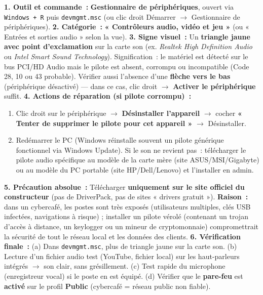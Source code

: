 \documentclass[11pt]{article}
\begin{document}
\begin{corrige}
\textbf{1. Outil et commande~:} \textbf{Gestionnaire de périphériques}, ouvert via \texttt{Windows + R} puis \texttt{devmgmt.msc} (ou clic droit Démarrer $\rightarrow$ Gestionnaire de périphériques).
\textbf{2. Catégorie~:} \textbf{« Contrôleurs audio, vidéo et jeu »} (ou « Entrées et sorties audio » selon la vue).
\textbf{3. Signe visuel~:} Un \textbf{triangle jaune avec point d'exclamation} sur la carte son (ex. \emph{Realtek High Definition Audio} ou \emph{Intel Smart Sound Technology}). Signification~: le matériel est détecté sur le bus PCI/HD Audio mais le pilote est absent, corrompu ou incompatible (Code 28, 10 ou 43 probable). Vérifier aussi l'absence d'une \textbf{flèche vers le bas} (périphérique désactivé) — dans ce cas, clic droit $\rightarrow$ \textbf{Activer le périphérique} suffit.
\textbf{4. Actions de réparation (si pilote corrompu)~:}
\begin{enumerate}
  \item Clic droit sur le périphérique $\rightarrow$ \textbf{Désinstaller l'appareil} $\rightarrow$ cocher \textbf{« Tenter de supprimer le pilote pour cet appareil »} $\rightarrow$ Désinstaller.
  \item Redémarrer le PC (Windows réinstalle souvent un pilote générique fonctionnel via Windows Update). Si le son ne revient pas~: télécharger le pilote audio spécifique au modèle de la carte mère (site ASUS/MSI/Gigabyte) ou au modèle du PC portable (site HP/Dell/Lenovo) et l'installer en admin.
\end{enumerate}
\textbf{5. Précaution absolue~:} Télécharger \textbf{uniquement sur le site officiel du constructeur} (pas de DriverPack, pas de sites « drivers gratuit »). \textbf{Raison~:} dans un cybercafé, les postes sont très exposés (utilisateurs multiples, clés USB infectées, navigations à risque) ; installer un pilote vérolé (contenant un trojan d'accès à distance, un keylogger ou un mineur de cryptomonnaie) compromettrait la sécurité de tout le réseau local et les données des clients.
\textbf{6. Vérification finale~:} (a) Dans \texttt{devmgmt.msc}, plus de triangle jaune sur la carte son. (b) Lecture d'un fichier audio test (YouTube, fichier local) sur les haut-parleurs intégrés $\rightarrow$ son clair, sans grésillement. (c) Test rapide du microphone (enregistreur vocal) si le poste en est équipé. (d) Vérifier que le \textbf{pare-feu} est \textbf{activé} sur le profil \textbf{Public} (cybercafé = réseau public non fiable).
\end{corrige}
\end{document}
